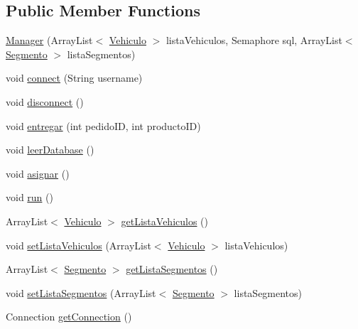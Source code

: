 \subsection*{Public Member Functions}
\begin{DoxyCompactItemize}
\item 
\mbox{\hyperlink{classsimulator_1_1_manager_af97cb12adc0ee7caa9e83f73ee85c04a}{Manager}} (Array\+List$<$ \mbox{\hyperlink{classsimulator_1_1_vehiculo}{Vehiculo}} $>$ lista\+Vehiculos, Semaphore sql, Array\+List$<$ \mbox{\hyperlink{classsimulator_1_1_segmento}{Segmento}} $>$ lista\+Segmentos)
\item 
void \mbox{\hyperlink{classsimulator_1_1_manager_adba6b4255dbc64064c6577e4baadbe9a}{connect}} (String username)
\item 
void \mbox{\hyperlink{classsimulator_1_1_manager_af238d6fc1282f769de925bf6aa9cdca9}{disconnect}} ()
\item 
void \mbox{\hyperlink{classsimulator_1_1_manager_a92b9df5fb7f406bfe8f99cdb8b6ee22a}{entregar}} (int pedido\+ID, int producto\+ID)
\item 
void \mbox{\hyperlink{classsimulator_1_1_manager_a318010c8020487c27cc127fdfe75402a}{leer\+Database}} ()
\item 
void \mbox{\hyperlink{classsimulator_1_1_manager_a6c22bed4ba7b715b4a4c0326ffd1f8a1}{asignar}} ()
\item 
void \mbox{\hyperlink{classsimulator_1_1_manager_ad98ac45d17514772c17a9c65be7d3892}{run}} ()
\item 
Array\+List$<$ \mbox{\hyperlink{classsimulator_1_1_vehiculo}{Vehiculo}} $>$ \mbox{\hyperlink{classsimulator_1_1_manager_a55b039767305793c0b904b49fe41cd56}{get\+Lista\+Vehiculos}} ()
\item 
void \mbox{\hyperlink{classsimulator_1_1_manager_a8f54c75ba31adb082ffbf25813caad71}{set\+Lista\+Vehiculos}} (Array\+List$<$ \mbox{\hyperlink{classsimulator_1_1_vehiculo}{Vehiculo}} $>$ lista\+Vehiculos)
\item 
Array\+List$<$ \mbox{\hyperlink{classsimulator_1_1_segmento}{Segmento}} $>$ \mbox{\hyperlink{classsimulator_1_1_manager_a8d708b20d559aa8fd42c9f963f2dc6d4}{get\+Lista\+Segmentos}} ()
\item 
void \mbox{\hyperlink{classsimulator_1_1_manager_af491f7a126893a6436bbd624ffc17ed9}{set\+Lista\+Segmentos}} (Array\+List$<$ \mbox{\hyperlink{classsimulator_1_1_segmento}{Segmento}} $>$ lista\+Segmentos)
\item 
Connection \mbox{\hyperlink{classsimulator_1_1_manager_a2a8f351e284baaf0b7ecd92dbf71468b}{get\+Connection}} ()

\end{DoxyCompactItemize}
